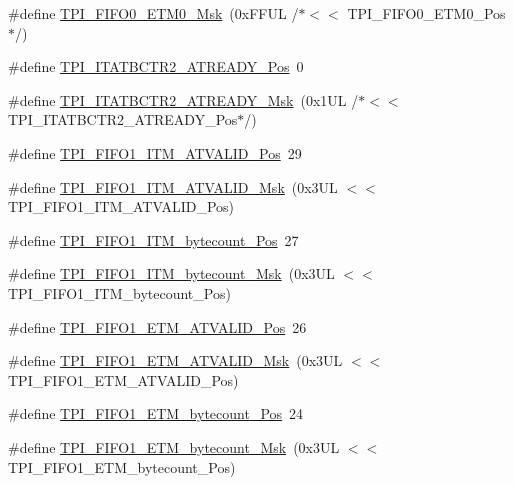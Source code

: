 \begin{DoxyCompactItemize}
\#define \hyperlink{group___c_m_s_i_s___t_p_i_gaf924f7d1662f3f6c1da12052390cb118}{T\+P\+I\+\_\+\+F\+I\+F\+O0\+\_\+\+E\+T\+M0\+\_\+\+Msk}~(0x\+F\+F\+U\+L /$\ast$$<$$<$ T\+P\+I\+\_\+\+F\+I\+F\+O0\+\_\+\+E\+T\+M0\+\_\+\+Pos$\ast$/)
\item 
\#define \hyperlink{group___c_m_s_i_s___t_p_i_ga6959f73d7db4a87ae9ad9cfc99844526}{T\+P\+I\+\_\+\+I\+T\+A\+T\+B\+C\+T\+R2\+\_\+\+A\+T\+R\+E\+A\+D\+Y\+\_\+\+Pos}~0
\item 
\#define \hyperlink{group___c_m_s_i_s___t_p_i_ga1859502749709a2e5ead9a2599d998db}{T\+P\+I\+\_\+\+I\+T\+A\+T\+B\+C\+T\+R2\+\_\+\+A\+T\+R\+E\+A\+D\+Y\+\_\+\+Msk}~(0x1\+U\+L /$\ast$$<$$<$ T\+P\+I\+\_\+\+I\+T\+A\+T\+B\+C\+T\+R2\+\_\+\+A\+T\+R\+E\+A\+D\+Y\+\_\+\+Pos$\ast$/)
\item 
\#define \hyperlink{group___c_m_s_i_s___t_p_i_ga08edfc862b2c8c415854cc4ae2067dfb}{T\+P\+I\+\_\+\+F\+I\+F\+O1\+\_\+\+I\+T\+M\+\_\+\+A\+T\+V\+A\+L\+I\+D\+\_\+\+Pos}~29
\item 
\#define \hyperlink{group___c_m_s_i_s___t_p_i_gabc1f6a3b6cac0099d7c01ca949b4dd08}{T\+P\+I\+\_\+\+F\+I\+F\+O1\+\_\+\+I\+T\+M\+\_\+\+A\+T\+V\+A\+L\+I\+D\+\_\+\+Msk}~(0x3\+U\+L $<$$<$ T\+P\+I\+\_\+\+F\+I\+F\+O1\+\_\+\+I\+T\+M\+\_\+\+A\+T\+V\+A\+L\+I\+D\+\_\+\+Pos)
\item 
\#define \hyperlink{group___c_m_s_i_s___t_p_i_gaa22ebf7c86e4f4b2c98cfd0b5981375a}{T\+P\+I\+\_\+\+F\+I\+F\+O1\+\_\+\+I\+T\+M\+\_\+bytecount\+\_\+\+Pos}~27
\item 
\#define \hyperlink{group___c_m_s_i_s___t_p_i_gacba2edfc0499828019550141356b0dcb}{T\+P\+I\+\_\+\+F\+I\+F\+O1\+\_\+\+I\+T\+M\+\_\+bytecount\+\_\+\+Msk}~(0x3\+U\+L $<$$<$ T\+P\+I\+\_\+\+F\+I\+F\+O1\+\_\+\+I\+T\+M\+\_\+bytecount\+\_\+\+Pos)
\item 
\#define \hyperlink{group___c_m_s_i_s___t_p_i_ga3177b8d815cf4a707a2d3d3d5499315d}{T\+P\+I\+\_\+\+F\+I\+F\+O1\+\_\+\+E\+T\+M\+\_\+\+A\+T\+V\+A\+L\+I\+D\+\_\+\+Pos}~26
\item 
\#define \hyperlink{group___c_m_s_i_s___t_p_i_ga0e8f29a1e9378d1ceb0708035edbb86d}{T\+P\+I\+\_\+\+F\+I\+F\+O1\+\_\+\+E\+T\+M\+\_\+\+A\+T\+V\+A\+L\+I\+D\+\_\+\+Msk}~(0x3\+U\+L $<$$<$ T\+P\+I\+\_\+\+F\+I\+F\+O1\+\_\+\+E\+T\+M\+\_\+\+A\+T\+V\+A\+L\+I\+D\+\_\+\+Pos)
\item 
\#define \hyperlink{group___c_m_s_i_s___t_p_i_gaab31238152b5691af633a7475eaf1f06}{T\+P\+I\+\_\+\+F\+I\+F\+O1\+\_\+\+E\+T\+M\+\_\+bytecount\+\_\+\+Pos}~24
\item 
\#define \hyperlink{group___c_m_s_i_s___t_p_i_gab554305459953b80554fdb1908b73291}{T\+P\+I\+\_\+\+F\+I\+F\+O1\+\_\+\+E\+T\+M\+\_\+bytecount\+\_\+\+Msk}~(0x3\+U\+L $<$$<$ T\+P\+I\+\_\+\+F\+I\+F\+O1\+\_\+\+E\+T\+M\+\_\+bytecount\+\_\+\+Pos)

\end{DoxyCompactItemize}

